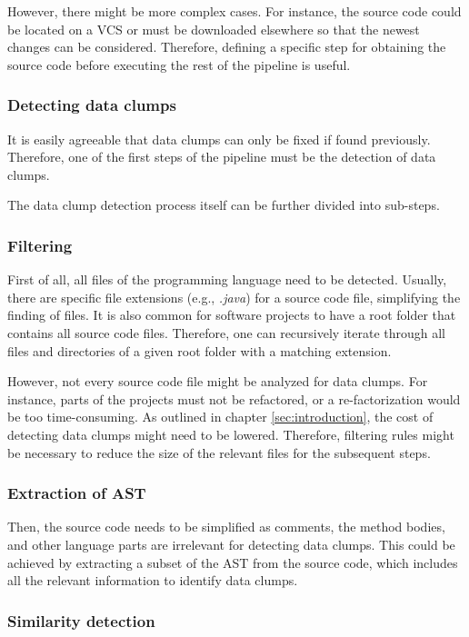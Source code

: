 However, there might be more complex cases. For instance, the source code could be located on a \ac{VCS} or must be downloaded elsewhere so that the newest changes can be considered. Therefore, defining a specific step for obtaining the source code before executing the rest of the pipeline is useful. 
\subsubsection{Detecting data clumps}\label{subsec:chap3_data_clump_detection}
It is easily agreeable that data clumps can only be fixed if found previously. Therefore, one of the first steps of the pipeline must be the detection of data clumps. 

The data clump detection process itself can be further divided into sub-steps.
\subsubsection{Filtering}\label{subsub:filtering_files}
First of all, all files of the programming language need to be detected. Usually, there are specific file extensions (e.g., \textit{.java}) for a source code file, simplifying the finding of files. It is also common for software projects to have a root folder that contains all source code files. Therefore, one can recursively iterate through all files and directories of a given root folder with a matching extension. 

However, not every source code file might be analyzed for data clumps. For instance, parts of the projects must not be refactored, or a re-factorization would be too time-consuming. As outlined in chapter \ref{sec:introduction}, the cost of detecting data clumps might need to be lowered. Therefore, filtering rules might be necessary to reduce the size of the relevant files for the subsequent steps.  

\subsubsection{Extraction of AST}
Then,  the source code needs to be simplified as comments, the method bodies, and other language parts are irrelevant for detecting data clumps. This could be achieved by extracting a subset of the \ac{AST} from the source code, which includes all the relevant information to identify data clumps.
\subsubsection{Similarity detection}

